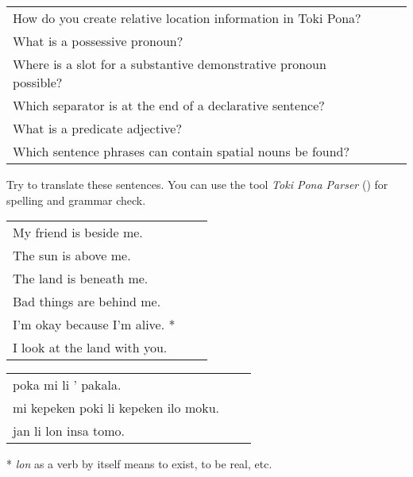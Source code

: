 \begin{supertabular}{p{5,5cm}|ll}
How do you create relative location information in Toki Pona? &&  \\ %
What is a possessive pronoun? && \\ %
Where is a slot for a substantive demonstrative pronoun possible? &&   \\ %
Which separator is at the end of a declarative sentence? &&  \\ %
What is a predicate adjective? &&  \\ %
Which sentence phrases can contain spatial nouns be found? &&   \\ %
\end{supertabular}

Try to translate these sentences. 
You can use the tool \textit{Toki Pona Parser} (\cite{www:rowa:02}) for spelling and grammar check. 

\begin{supertabular}{p{5,5cm}|ll}
My friend is beside me. && \\ %
The sun is above me. && \\ %
The land is beneath me. && \\ %
Bad things are behind me. && \\ %
I'm okay because I'm alive. * && \\ %
I look at the land with you. && \\ %
\end{supertabular}

\begin{supertabular}{p{5,5cm}|ll}
poka mi li ' pakala. && \\ %
mi kepeken poki li kepeken ilo moku. && \\ %
jan li lon insa tomo. && \\ %
\end{supertabular} 

* \textit{lon} as a verb by itself means to exist, to be real, etc. 
% 
